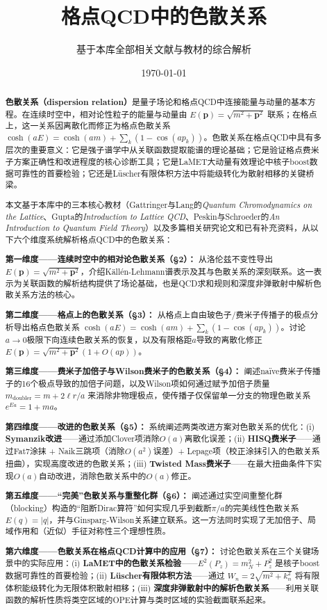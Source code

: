 \documentclass[12pt,a4paper]{ctexart}
\title{\heiti 格点QCD中的色散关系}
\author{基于本库全部相关文献与教材的综合解析}
\date{\today}
\theoremstyle{definition}
\begin{document}
\maketitle

\begin{abstract}
\noindent
\textbf{色散关系（dispersion relation）}是量子场论和格点QCD中连接能量与动量的基本方程。在连续时空中，相对论性粒子的能量与动量由 $E(\mathbf{p}) = \sqrt{m^2 + \mathbf{p}^2}$ 联系；在格点上，这一关系因离散化而修正为格点色散关系 $\cosh(aE) = \cosh(am) + \sum_{k}(1 - \cos(ap_k))$。色散关系在格点QCD中具有多层次的重要意义：它是强子谱学中从关联函数提取能谱的理论基础；它是验证格点费米子方案正确性和改进程度的核心诊断工具；它是LaMET大动量有效理论中核子boost数据可靠性的首要检验；它还是L\"uscher有限体积方法中将能级转化为散射相移的关键桥梁。

本文基于本库中的三本核心教材（Gattringer与Lang的\textit{Quantum Chromodynamics on the Lattice}、Gupta的\textit{Introduction to Lattice QCD}、Peskin与Schroeder的\textit{An Introduction to Quantum Field Theory}）以及多篇相关研究论文和已有补充资料，从以下六个维度系统解析格点QCD中的色散关系：

\textbf{第一维度——连续时空中的相对论色散关系（§2）：}
从洛伦兹不变性导出 $E(\mathbf{p}) = \sqrt{m^2 + \mathbf{p}^2}$，介绍K\"all\'en-Lehmann谱表示及其与色散关系的深刻联系。这一表示为关联函数的解析结构提供了场论基础，也是QCD求和规则和深度非弹散射中解析色散关系方法的核心。

\textbf{第二维度——格点上的色散关系（§3）：}
从格点上自由玻色子/费米子传播子的极点分析导出格点色散关系 $\cosh(aE) = \cosh(am) + \sum_{k}(1 - \cos(ap_k))$。讨论$a \to 0$极限下向连续色散关系的恢复，以及有限格距$a$导致的离散化修正 $E(\mathbf{p}) = \sqrt{m^2 + \mathbf{p}^2}(1 + O(ap))$。

\textbf{第三维度——费米子加倍子与Wilson费米子的色散关系（§4）：}
阐述na\"ive费米子传播子的16个极点导致的加倍子问题，以及Wilson项如何通过赋予加倍子质量 $m_{\text{doubler}} = m + 2\ell r/a$ 来消除非物理极点，使传播子仅保留单一分支的物理色散关系 $e^{Ea} = 1 + ma$。

\textbf{第四维度——改进的色散关系（§5）：}
系统阐述两类改进方案对色散关系的优化：(i) \textbf{Symanzik改进}——通过添加Clover项消除$O(a)$离散化误差；(ii) \textbf{HISQ费米子}——通过Fat7涂抹 + Naik三跳项（消除$O(a^2)$误差）+ Lepage项（校正涂抹引入的色散关系扭曲），实现高度改进的色散关系；(iii) \textbf{Twisted Mass费米子}——在最大扭曲条件下实现$O(a)$自动改进，消除色散关系中的$O(a)$修正。

\textbf{第五维度——``完美''色散关系与重整化群（§6）：}
阐述通过实空间重整化群（blocking）构造的``阻断Dirac算符''如何实现几乎到截断$\pi/a$的完美线性色散关系 $E(q) = |q|$，并与Ginsparg-Wilson关系建立联系。这一方法同时实现了无加倍子、局域作用和（近似）手征对称性三个理想性质。

\textbf{第六维度——色散关系在格点QCD计算中的应用（§7）：}
讨论色散关系在三个关键场景中的实际应用：(i) \textbf{LaMET中的色散关系检验}——$E^2(P_z) = m_N^2 + P_z^2$ 是核子boost数据可靠性的首要检验；(ii) \textbf{L\"uscher有限体积方法}——通过 $W_n = 2\sqrt{m^2 + k_n^2}$ 将有限体积能级转化为无限体积散射相移；(iii) \textbf{深度非弹散射中的解析色散关系}——利用关联函数的解析性质将类空区域的OPE计算与类时区域的实验截面联系起来。
\end{abstract}
\end{document}
